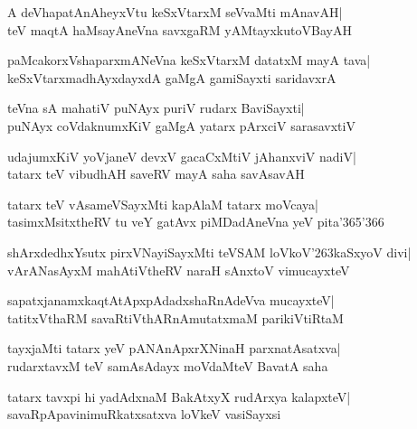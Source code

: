 \documentclass[twoside,12pt,openright]{book}
\def\S{\char'263}
\newcounter{shloka}[chapter]
\begin{document}
\begin{shloka}%
A deVhapatAnAheyxVtu keSxVtarxM seVvaMti mAnavAH|\\
teV maqtA haMsayAneVna savxgaRM yAMtayxkutoVBayAH
\end{shloka}

\begin{shloka}%
paMcakorxVshaparxmANeVna keSxVtarxM datatxM mayA tava|\\
keSxVtarxmadhAyxdayxdA gaMgA gamiSayxti saridavxrA
\end{shloka}

\begin{shloka}%
teVna sA mahatiV puNAyx puriV rudarx BaviSayxti|\\
puNAyx coVdaknumxKiV gaMgA yatarx pArxciV sarasavxtiV
\end{shloka}

\begin{shloka}%
udajumxKiV yoVjaneV devxV gacaCxMtiV jAhanxviV nadiV|\\
tatarx teV vibudhAH saveRV mayA saha savAsavAH
\end{shloka}

\begin{shloka}%
tatarx teV vAsameVSayxMti kapAlaM tatarx moVcaya|\\
tasimxMsitxtheRV tu veY gatAvx piMDadAneVna yeV pita\char'365\char'366
\end{shloka}

\begin{shloka}%
shArxdedhxYsutx pirxVNayiSayxMti teVSAM loVkoV\S kaSxyoV divi|\\
vArANasAyxM mahAtiVtheRV naraH sAnxtoV vimucayxteV
\end{shloka}

\begin{shloka}%
sapatxjanamxkaqtAtApxpAdadxshaRnAdeVva mucayxteV|\\
tatitxVthaRM savaRtiVthARnAmutatxmaM parikiVtiRtaM
\end{shloka}

\begin{shloka}%
tayxjaMti tatarx yeV pANAnApxrXNinaH parxnatAsatxva|\\
rudarxtavxM teV samAsAdayx moVdaMteV BavatA saha
\end{shloka}

\begin{shloka}%
tatarx tavxpi hi yadAdxnaM BakAtxyX rudArxya kalapxteV|\\
savaRpApavinimuRkatxsatxva loVkeV vasiSayxsi
\end{shloka}
\end{document}
